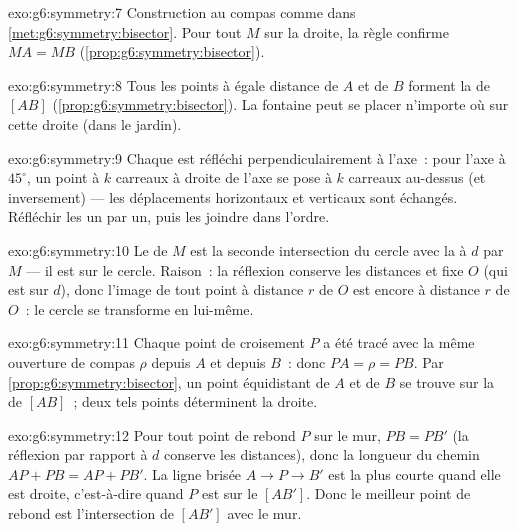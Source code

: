 \begin{solution}{exo:g6:symmetry:7}
Construction au compas comme dans \cref{met:g6:symmetry:bisector}.
Pour tout $M$ sur la droite, la règle confirme $MA = MB$
(\cref{prop:g6:symmetry:bisector}).
\end{solution}

\begin{solution}{exo:g6:symmetry:8}
Tous les points à égale distance de $A$ et de $B$ forment la
 de $[AB]$ (\cref{prop:g6:symmetry:bisector}). La fontaine
peut se placer n'importe où sur cette droite (dans le jardin).
\end{solution}

\begin{solution}{exo:g6:symmetry:9}
Chaque  est réfléchi perpendiculairement à l'axe~: pour l'axe à
$45^\circ$, un point à $k$ carreaux à droite de l'axe se pose à $k$
carreaux au-dessus (et inversement) --- les déplacements horizontaux
et verticaux sont échangés. Réfléchir les  un par un, puis les
joindre dans l'ordre.
\end{solution}

\begin{solution}{exo:g6:symmetry:10}
Le  de $M$ est la seconde intersection du cercle avec la
 à $d$ par $M$ --- il est sur le cercle. Raison~: la
réflexion conserve les distances et fixe $O$ (qui est sur $d$), donc
l'image de tout point à distance $r$ de $O$ est encore à distance $r$
de $O$~: le cercle se transforme en lui-même.
\end{solution}

\begin{solution}{exo:g6:symmetry:11}
Chaque point de croisement $P$ a été tracé avec la même ouverture de
compas $\rho$ depuis $A$ et depuis $B$~: donc $PA = \rho = PB$. Par
\cref{prop:g6:symmetry:bisector}, un point équidistant de $A$ et de
$B$ se trouve sur la  de $[AB]$~; deux tels points
déterminent la droite.
\end{solution}

\begin{solution}{exo:g6:symmetry:12}
Pour tout point de rebond $P$ sur le mur, $PB = PB'$ (la réflexion
par rapport à $d$ conserve les distances), donc la longueur du chemin
$AP + PB = AP + PB'$. La ligne brisée $A \to P \to B'$ est la plus
courte quand elle est droite, c'est-à-dire quand $P$ est sur le
 $[AB']$. Donc le meilleur point de rebond est l'intersection
de $[AB']$ avec le mur.
\end{solution}

